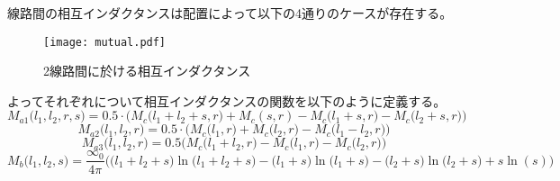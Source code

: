 線路間の相互インダクタンスは配置によって以下の4通りのケースが存在する。
\begin{figure}[H]
    \centering
    \texttt{[image: mutual.pdf]}
    \caption{2線路間に於ける相互インダクタンス}
\end{figure}
よってそれぞれについて相互インダクタンスの関数を以下のように定義する。
\begin{equation}
    M_{a 1}\biggl(l_{1}, l_{2}, r, s\biggr)=0.5 \cdot\biggl(M_{c}\biggl(l_{1}+l_{2}+s, r\biggr)+M_{c}(s, r)-M_{c}\biggl(l_{1}+s, r\biggr)-M_{c}\biggl(l_{2}+s, r\biggr)\biggr)
\end{equation}
\begin{equation}
    M_{a 2}\biggl(l_{1}, l_{2}, r\biggr)=0.5 \cdot\biggl(M_{c}\biggl(l_{1}, r\biggr)+M_{c}\biggl(l_{2}, r\biggr)-M_{c}\biggl(l_{1}-l_{2}, r\biggr)\biggr)
\end{equation}
\begin{equation}
    M_{a 3}\biggl(l_{1}, l_{2}, r\biggr)=0.5\biggl(M_{c}\biggl(l_{1}+l_{2}, r\biggr)-M_{c}\biggl(l_{1}, r\biggr)-M_{c}\biggl(l_{2}, r\biggr)\biggr)
\end{equation}
\begin{equation}
    M_{b}\biggl(l_{1}, l_{2}, s\biggr)=\frac{\infty_{0}}{4 \pi}\biggl(\biggl(l_{1}+l_{2}+s\biggr) \ln \biggl(l_{1}+l_{2}+s\biggr)-\biggl(l_{1}+s\biggr) \ln \biggl(l_{1}+s\biggr)-\biggl(l_{2}+s\biggr) \ln \biggl(l_{2}+s\biggr)+s \ln (s)\biggr)
\end{equation}

